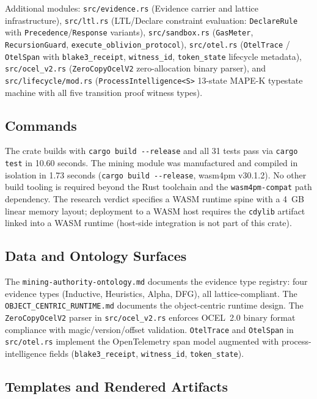 Additional modules: \texttt{src/evidence.rs} (Evidence carrier and lattice infrastructure),
\texttt{src/ltl.rs} (LTL/Declare constraint evaluation: \texttt{DeclareRule} with
\texttt{Precedence}/\texttt{Response} variants), \texttt{src/sandbox.rs} (\texttt{GasMeter},
\texttt{RecursionGuard}, \texttt{execute\_oblivion\_protocol}), \texttt{src/otel.rs}
(\texttt{OtelTrace} / \texttt{OtelSpan} with \texttt{blake3\_receipt}, \texttt{witness\_id},
\texttt{token\_state} lifecycle metadata), \texttt{src/ocel\_v2.rs}
(\texttt{ZeroCopyOcelV2} zero-allocation binary parser), and \texttt{src/lifecycle/mod.rs}
(\texttt{ProcessIntelligence<S>} 13-state MAPE-K typestate machine with all five transition proof
witness types).

\subsection{Commands}
\label{sec:sources-wasm4pm-impl-commands}

The crate builds with \texttt{cargo build -{}-release} and all 31 tests pass via \texttt{cargo
test} in 10.60 seconds. The mining module was manufactured and compiled in isolation in 1.73
seconds (\texttt{cargo build -{}-release}, wasm4pm v30.1.2). No other build tooling is required
beyond the Rust toolchain and the \texttt{wasm4pm-compat} path dependency. The research verdict
specifies a WASM runtime spine with a 4~GB linear memory layout; deployment to a WASM host
requires the \texttt{cdylib} artifact linked into a WASM runtime (host-side integration is not
part of this crate).

\subsection{Data and Ontology Surfaces}
\label{sec:sources-wasm4pm-impl-data-ontology}

The \texttt{mining-authority-ontology.md} documents the evidence type registry: four evidence
types (Inductive, Heuristics, Alpha, DFG), all lattice-compliant. The
\texttt{OBJECT\_CENTRIC\_RUNTIME.md} documents the object-centric runtime design. The
\texttt{ZeroCopyOcelV2} parser in \texttt{src/ocel\_v2.rs} enforces OCEL~2.0 binary format
compliance with magic/version/offset validation. \texttt{OtelTrace} and \texttt{OtelSpan} in
\texttt{src/otel.rs} implement the OpenTelemetry span model augmented with process-intelligence
fields (\texttt{blake3\_receipt}, \texttt{witness\_id}, \texttt{token\_state}).

\subsection{Templates and Rendered Artifacts}
\label{sec:sources-wasm4pm-impl-templates}

